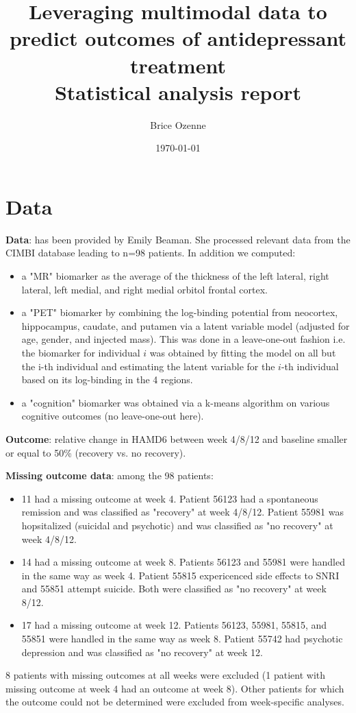 \documentclass[12pt]{article}
\author{Brice Ozenne}
\date{\today}
\title{Leveraging multimodal data to predict outcomes of antidepressant treatment\\\medskip
\large Statistical analysis report}
\begin{document}
\maketitle

\section{Data}
\label{sec:org1ccd285}

\textbf{Data}: has been provided by Emily Beaman. She processed relevant data
from the CIMBI database leading to n=98 patients. In addition we
computed:
\begin{itemize}
\item a "MR" biomarker as the average of the thickness of the left
lateral, right lateral, left medial, and right medial orbitol
frontal cortex.
\item a "PET" biomarker by combining the log-binding potential from
neocortex, hippocampus, caudate, and putamen via a latent variable
model (adjusted for age, gender, and injected mass). This was done
in a leave-one-out fashion i.e. the biomarker for individual \(i\)
was obtained by fitting the model on all but the i-th individual and
estimating the latent variable for the \(i\)-th individual based on
its log-binding in the 4 regions.
\item a "cognition" biomarker was obtained via a k-means algorithm on
various cognitive outcomes (no leave-one-out here).
\end{itemize}

\textbf{Outcome}: relative change in HAMD6 between week 4/8/12 and baseline
  smaller or equal to 50\% (recovery vs. no recovery).

\bigskip

\textbf{Missing outcome data}: among the 98 patients:
\begin{itemize}
\item 11 had a missing outcome at week 4. Patient 56123 had a spontaneous
remission and was classified as "recovery" at week 4/8/12. Patient
55981 was hopsitalized (suicidal and psychotic) and was classified
as "no recovery" at week 4/8/12.
\item 14 had a missing outcome at week 8. Patients 56123 and 55981 were
handled in the same way as week 4. Patient 55815 expericenced side effects to
SNRI and 55851 attempt suicide. Both were classified as "no
recovery" at week 8/12.
\item 17 had a missing outcome at week 12. Patients 56123, 55981, 55815,
and 55851 were handled in the same way as week 8. Patient 55742 had psychotic
depression and was classified as "no recovery" at week 12.
\end{itemize}
8 patients with missing outcomes at all weeks were excluded (1 patient
with missing outcome at week 4 had an outcome at week 8). Other
patients for which the outcome could not be determined were excluded
from week-specific analyses.
\end{document}
